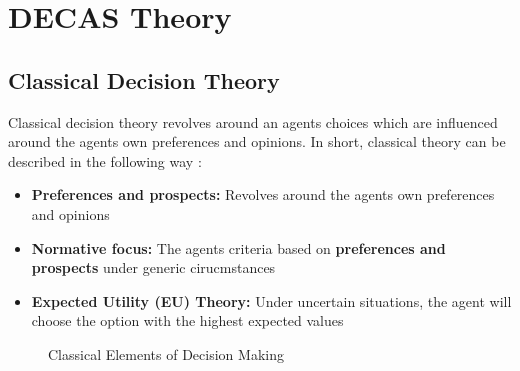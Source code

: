 \section{DECAS Theory}

\subsection{Classical Decision Theory}\label{subsec:ClassicalDecisionTheory}

Classical decision theory revolves around an agents choices which are influenced around the agents own preferences
and opinions. In short, classical theory can be described in the following way \cite{Steele2020DecisionTheory}:

\begin{itemize}
    \item \textbf{Preferences and prospects:} Revolves around the agents own preferences and opinions
    \item \textbf{Normative focus:} The agents criteria based on \textbf{preferences and prospects} under generic cirucmstances
    \item \textbf{Expected Utility (EU) Theory:} Under uncertain situations, the agent will choose the option with the highest expected values
\end{itemize}

\begin{figure}[h]
    \centering
    \caption{Classical Elements of Decision Making}
    \label{fig:ClassicalElements}
\end{figure}

